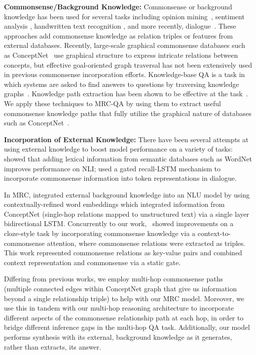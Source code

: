 \documentclass[11pt,a4paper]{article}
\begin{document}
\noindent\textbf{Commonsense/Background Knowledge:}
Commonsense or background knowledge has been used for several tasks including opinion mining~\cite{cambria2010sentic}, sentiment analysis \cite{poria2015sentiment,poria2016sentic}, handwritten text recognition \cite{wang2013common}, and more recently, dialogue~\cite{young2017augmenting,ghazvininejad2017knowledge}.
These approaches add commonsense knowledge as relation triples or features from external databases. 
Recently, large-scale graphical commonsense databases such as ConceptNet~\cite{speer2012representing} use graphical structure to express intricate relations between concepts, but effective goal-oriented graph traversal has not been extensively used in previous commonsense incorporation efforts.
Knowledge-base QA is a task in which systems are asked to find answers to questions by traversing knowledge graphs~\cite{bollacker2008freebase}. Knowledge path extraction has been shown to be effective at the task~\cite{bordes2014question,constraint_bao}.
We apply these techniques to MRC-QA by using them to extract useful commonsense knowledge paths that fully utilize the graphical nature of databases such as ConceptNet~\cite{speer2012representing}.

\noindent\textbf{Incorporation of External Knowledge:}
There have been several attempts at using external knowledge to boost model performance on a variety of tasks:
 showed that adding lexical information from semantic databases such as WordNet improves performance on NLI;  used a gated recall-LSTM mechanism to incorporate commonsense information into token representations in dialogue.

In MRC,  integrated external background knowledge into an NLU model by using contextually-refined word embeddings which integrated information from ConceptNet (single-hop relations mapped to unstructured text) via a single layer bidirectional LSTM.
Concurrently to our work,~ showed improvements on a cloze-style task by incorporating commonsense knowledge via a context-to-commonsense attention, where commonsense relations were extracted as triples. This work represented commonsense relations as key-value pairs and combined context representation and commonsense via a static gate.

Differing from previous works, we employ multi-hop commonsense paths (multiple connected edges within ConceptNet graph that give us information beyond a single relationship triple) to help with our MRC model. Moreover, we use this in tandem with our multi-hop reasoning architecture to incorporate different aspects of the commonsense relationship path at each hop, in order to bridge different inference gaps in the multi-hop QA task. Additionally, our model performs synthesis with its external, background knowledge as it generates, rather than extracts, its answer.
\end{document}
